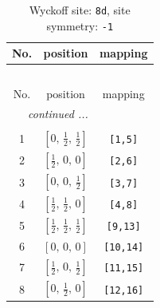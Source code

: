\documentclass[fleqn,8pt]{jsarticle}
\begin{document}
\begin{longtable}{ccc}
\caption{Wyckoff site: {\tt 8d}, site symmetry: {\tt -1}}
 \\
 \hline \hline
No. & position & mapping \\ \hline \endfirsthead

\multicolumn{2}{l}{\tablename\ \thetable{}} \\
 \hline \hline
No. & position & mapping \\ \hline \endhead

 \hline \hline
\multicolumn{2}{r}{\footnotesize\it continued ...} \\ \endfoot

 \hline \hline
\multicolumn{2}{r}{} \\ \endlastfoot

1 & $\left[ 0,\, \frac{1}{2},\, \frac{1}{2} \right]$ & {\tt [1,5]} \\ \hline
2 & $\left[ \frac{1}{2},\, 0,\, 0 \right]$ & {\tt [2,6]} \\ \hline
3 & $\left[ 0,\, 0,\, \frac{1}{2} \right]$ & {\tt [3,7]} \\ \hline
4 & $\left[ \frac{1}{2},\, \frac{1}{2},\, 0 \right]$ & {\tt [4,8]} \\ \hline
5 & $\left[ \frac{1}{2},\, \frac{1}{2},\, \frac{1}{2} \right]$ & {\tt [9,13]} \\ \hline
6 & $\left[ 0,\, 0,\, 0 \right]$ & {\tt [10,14]} \\ \hline
7 & $\left[ \frac{1}{2},\, 0,\, \frac{1}{2} \right]$ & {\tt [11,15]} \\ \hline
8 & $\left[ 0,\, \frac{1}{2},\, 0 \right]$ & {\tt [12,16]} \\
\end{longtable}
\renewcommand{\arraystretch}{1.2}
\end{document}
